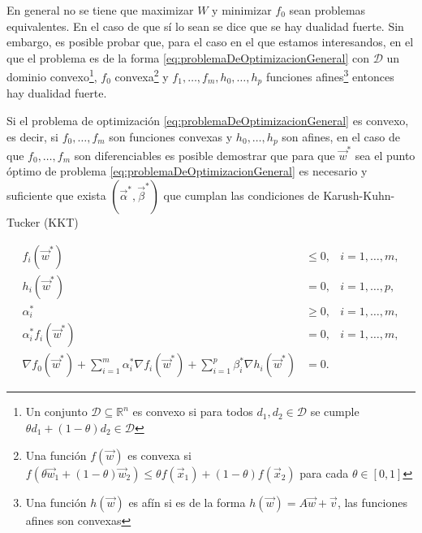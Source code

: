 \documentclass[letterpaper,12pt]{book}
\begin{document}
En general no se tiene que maximizar $W$ y minimizar $f_0$ sean problemas equivalentes. En el caso de que sí lo sean se dice que se hay dualidad fuerte. Sin embargo, es posible probar que, para el caso en el que estamos interesandos, en el que el problema es de la forma \ref{eq:problemaDeOptimizacionGeneral} con $\mathcal{D}$ un dominio convexo\footnote{Un conjunto $\mathcal{D} \subseteq \mathbb{R}^n$ es convexo si para todos $d_1, d_2\in\mathcal{D}$ se cumple $\theta d_1+(1-\theta)d_2\in\mathcal{D}$}, $f_0$ convexa\footnote{Una función $f(\vec{w})$ es convexa si $f(\theta\vec{w}_{1}+(1-\theta)\vec{w}_{2})\leq \theta f(\vec{x}_{1})+(1-\theta)f(\vec{x}_{2})$ para cada $\theta\in[0,1]$} y $f_1,\dots,f_m,h_0,\dots,h_p$ funciones afines\footnote{Una función $h(\vec{w})$ es afín si es de la forma $h(\vec{w}) = A\vec{w}+\vec{v}$, las funciones afines son convexas} entonces hay dualidad fuerte.

Si el problema de optimización \ref{eq:problemaDeOptimizacionGeneral} es convexo, es decir, si $f_0,\dots, f_m$ son funciones convexas y $h_0,\dots,h_p$ son afines, en el caso de que $f_0,\dots, f_m$ son diferenciables es posible demostrar que para que $\vec{w}^*$ sea el punto óptimo de problema \ref{eq:problemaDeOptimizacionGeneral} es necesario y suficiente que exista $(\vec{\alpha}^*,\vec{\beta}^*)$ que cumplan las condiciones de Karush-Kuhn-Tucker (KKT)

\begin{align}
    f_i(\vec{w}^*) &\leq 0, & i=1,\dots,m, \\
    h_i(\vec{w}^*) &= 0, & i=1,\dots,p, \\
    \alpha_i^* &\geq 0, & i=1,\dots,m, \\
    \alpha_i^*f_i(\vec{w}^*) & = 0, & i=1,\dots,m, \label{eq:condicionComplementariedad}\\
    \nabla f_0(\vec{w}^*) + \sum_{i=1}^{m}\alpha_i^*\nabla f_i(\vec{w}^*) + \sum_{i=1}^{p}\beta_i^*\nabla h_i(\vec{w}^*) & = 0. &
\end{align}
\end{document}
